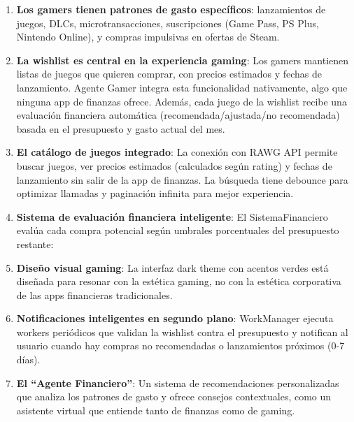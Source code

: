 \documentclass[
  spanish,
  11pt,
  paper=a4,
  ,captions=tableheading
]{scrartcl}
\renewenvironment{quote}{\begin{customblockquote}\list{}{\rightmargin=0em\leftmargin=0em}%
\item\relax\color{blockquote-text}\ignorespaces}{\unskip\unskip\endlist\end{customblockquote}}
\begin{document}
\begin{enumerate}
\def\labelenumi{\arabic{enumi}.}
\item
  \textbf{Los gamers tienen patrones de gasto específicos}: lanzamientos
  de juegos, DLCs, microtransacciones, suscripciones (Game Pass, PS
  Plus, Nintendo Online), y compras impulsivas en ofertas de Steam.
\item
  \textbf{La wishlist es central en la experiencia gaming}: Los gamers
  mantienen listas de juegos que quieren comprar, con precios estimados
  y fechas de lanzamiento. Agente Gamer integra esta funcionalidad
  nativamente, algo que ninguna app de finanzas ofrece. Además, cada
  juego de la wishlist recibe una evaluación financiera automática
  (recomendada/ajustada/no recomendada) basada en el presupuesto y gasto
  actual del mes.
\item
  \textbf{El catálogo de juegos integrado}: La conexión con RAWG API
  permite buscar juegos, ver precios estimados (calculados según rating)
  y fechas de lanzamiento sin salir de la app de finanzas. La búsqueda
  tiene debounce para optimizar llamadas y paginación infinita para
  mejor experiencia.
\item
  \textbf{Sistema de evaluación financiera inteligente}: El
  SistemaFinanciero evalúa cada compra potencial según umbrales
  porcentuales del presupuesto restante:

\item
  \textbf{Diseño visual gaming}: La interfaz dark theme con acentos
  verdes está diseñada para resonar con la estética gaming, no con la
  estética corporativa de las apps financieras tradicionales.
\item
  \textbf{Notificaciones inteligentes en segundo plano}: WorkManager
  ejecuta workers periódicos que validan la wishlist contra el
  presupuesto y notifican al usuario cuando hay compras no recomendadas
  o lanzamientos próximos (0-7 días).
\item
  \textbf{El ``Agente Financiero''}: Un sistema de recomendaciones
  personalizadas que analiza los patrones de gasto y ofrece consejos
  contextuales, como un asistente virtual que entiende tanto de finanzas
  como de gaming.
\end{enumerate}
\end{document}
